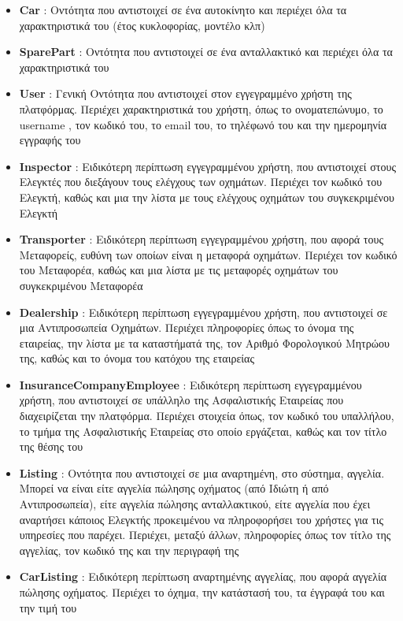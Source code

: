 \documentclass{../ol-softwaremanual}
\begin{document}
	\begin{itemize}
		\item \en \textbf{Car} \gr : Οντότητα που αντιστοιχεί σε ένα αυτοκίνητο και περιέχει όλα τα χαρακτηριστικά του (έτος κυκλοφορίας, μοντέλο κλπ)		
		\item \en \textbf{SparePart} \gr : Οντότητα που αντιστοιχεί σε ένα ανταλλακτικό και περιέχει όλα τα χαρακτηριστικά του
		\item \en \textbf{User} \gr : Γενική Οντότητα που αντιστοιχεί στον εγγεγραμμένο χρήστη της πλατφόρμας. Περιέχει χαρακτηριστικά του χρήστη, όπως το ονοματεπώνυμο, το \en username \gr, τον κωδικό του, το \en email \gr του, το τηλέφωνό του και την ημερομηνία εγγραφής του
		\item \en \textbf{Inspector} \gr : Ειδικότερη περίπτωση εγγεγραμμένου χρήστη, που αντιστοιχεί στους Ελεγκτές που διεξάγουν τους ελέγχους των οχημάτων. Περιέχει τον κωδικό του Ελεγκτή, καθώς και μια την λίστα με τους ελέγχους οχημάτων του συγκεκριμένου Ελεγκτή
		\item \en \textbf{Transporter} \gr : Ειδικότερη περίπτωση εγγεγραμμένου χρήστη, που αφορά τους Μεταφορείς, ευθύνη των οποίων είναι η μεταφορά οχημάτων. Περιέχει τον κωδικό του Μεταφορέα, καθώς και μια λίστα με τις μεταφορές οχημάτων του συγκεκριμένου Μεταφορέα
		\item \en \textbf{Dealership} \gr : Ειδικότερη περίπτωση εγγεγραμμένου χρήστη, που αντιστοιχεί σε μια Αντιπροσωπεία Οχημάτων. Περιέχει πληροφορίες όπως το όνομα της εταιρείας, την λίστα με τα καταστήματά της, τον Αριθμό Φορολογικού Μητρώου της, καθώς και το όνομα του κατόχου της εταιρείας
		\item \en \textbf{InsuranceCompanyEmployee} \gr : Ειδικότερη περίπτωση εγγεγραμμένου χρήστη, που αντιστοιχεί σε υπάλληλο της Ασφαλιστικής Εταιρείας που διαχειρίζεται την πλατφόρμα. Περιέχει στοιχεία όπως, τον κωδικό του υπαλλήλου, το τμήμα της Ασφαλιστικής Εταιρείας στο οποίο εργάζεται, καθώς και τον τίτλο της θέσης του
		\item \en \textbf{Listing} \gr : Οντότητα που αντιστοιχεί σε μια αναρτημένη, στο σύστημα, αγγελία. Μπορεί να είναι είτε αγγελία πώλησης οχήματος (από Ιδιώτη ή από Αντιπροσωπεία), είτε αγγελία πώλησης ανταλλακτικού, είτε αγγελία που έχει αναρτήσει κάποιος Ελεγκτής προκειμένου να πληροφορήσει του χρήστες για τις υπηρεσίες που παρέχει. Περιέχει, μεταξύ άλλων, πληροφορίες όπως τον τίτλο της αγγελίας, τον κωδικό της και την περιγραφή της
		\item \en \textbf{CarListing} \gr : Ειδικότερη περίπτωση αναρτημένης αγγελίας, που αφορά αγγελία πώλησης οχήματος. Περιέχει το όχημα, την κατάστασή του, τα έγγραφά του και την τιμή του

\end{itemize}
\end{document}
